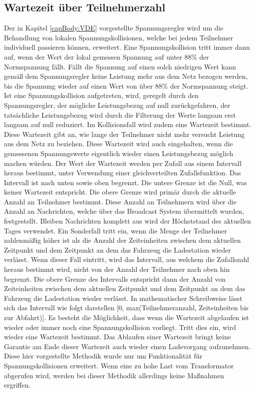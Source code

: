 \subsection{Wartezeit über Teilnehmerzahl}
\label{cap:background_sec:SA_participants}
Der in Kapitel \ref{capBody:VDE} vorgestellte Spannungsregler wird um die Behandlung von lokalen Spannungskollisionen, welche bei jedem Teilnehmer individuell passieren können, erweitert. Eine Spannungskollision tritt immer dann auf, wenn der Wert der lokal gemessen Spannung auf unter 88\% der Normspannung fällt. Fällt die Spannung auf einen solch niedrigen Wert kann gemäß dem Spannungsregler keine Leistung mehr aus dem Netz bezogen werden, bis die Spannung wieder auf einen Wert von über 88\% der Normspannung steigt. Ist eine Spannungskollision aufgetreten, wird, geregelt durch den Spannungsregler, der mögliche Leistungsbezug auf null zurückgefahren, der tatsächliche Leistungsbezug wird durch die Filterung der Werte langsam erst langsam auf null reduziert. Im Kollisionsfall wird zudem eine Wartezeit bestimmt. Diese Wartezeit gibt an, wie lange der Teilnehmer nicht mehr versucht Leistung aus dem Netz zu beziehen. Diese Wartezeit wird auch eingehalten, wenn die gemessenen Spannungswerte eigentlich wieder einen Leistungsbezug möglich machen würden. Der Wert der Wartezeit werden per Zufall aus einem Intervall heraus bestimmt, unter Verwendung einer gleichverteilten Zufallsfunktion. Das Intervall ist nach unten sowie oben begrenzt. Die untere Grenze ist die Null, was keiner Wartezeit entspricht. Die obere Grenze wird primär durch die aktuelle Anzahl an Teilnehmer bestimmt. Diese Anzahl an Teilnehmern wird über die Anzahl an Nachrichten, welche über das Broadcast System übermittelt wurden, festgestellt. Bleiben Nachrichten komplett aus wird der Höchststand des aktuellen Tages verwendet. Ein Sonderfall tritt ein, wenn die Menge der Teilnehmer zahlenmäßig höher ist als die Anzahl der Zeiteinheiten zwischen dem aktuellen Zeitpunkt und dem Zeitpunkt an dem das Fahrzeug die Ladestation wieder verlässt. Wenn dieser Fall eintritt, wird das Intervall, aus welchem die Zufallszahl heraus bestimmt wird, nicht von der Anzahl der Teilnehmer nach oben hin begrenzt. Die obere Grenze des Intervalls entspricht dann der Anzahl von Zeiteinheiten zwischen dem aktuellen Zeitpunkt und dem Zeitpunkt an dem das Fahrzeug die Ladestation wieder verlässt.  In mathematischer Schreibweise lässt sich das Intervall wie folgt darstellen [0, max(Teilnehmeranzahl, Zeiteinheiten bis zur Abfahrt)]. Es besteht die Möglichkeit, dass wenn die Wartezeit abgelaufen ist wieder oder immer noch eine Spannungskollision vorliegt. Tritt dies ein, wird wieder eine Wartezeit bestimmt. Das Ablaufen einer Wartezeit bringt keine Garantie am Ende dieser Wartezeit auch wieder einen Ladevorgang aufzunehmen. Diese hier vorgestellte Methodik wurde nur um Funktionalität für Spannungskollisionen erweitert. Wenn eine zu hohe Last vom Transformator abgerufen wird, werden bei dieser Methodik allerdings keine Maßnahmen ergriffen. \\
